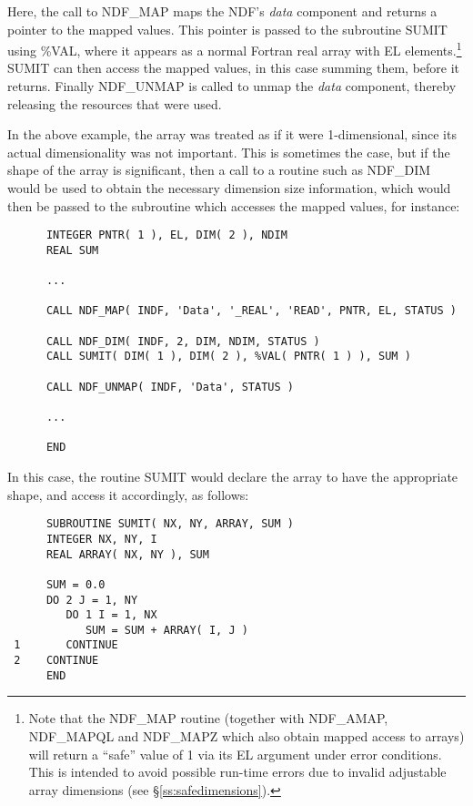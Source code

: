 \documentclass[twoside,11pt]{article}
\newcommand{\htmlref}[2]{#1}
\newcommand{\st}[1]{{\em{#1}}}
\begin{document}
Here, the call to NDF\_MAP maps the NDF's \st{data\/} component and returns a
pointer to the mapped values. 
This pointer is passed to the subroutine SUMIT using \%VAL, where it
appears as a normal Fortran real array with EL elements.\footnote{Note that
the NDF\_MAP routine (together with \htmlref{NDF\_AMAP}{NDF_AMAP}, \htmlref{NDF\_MAPQL}{NDF_MAPQL} and \htmlref{NDF\_MAPZ}{NDF_MAPZ}
which also obtain mapped access to arrays) will return a ``safe'' value of 1
via its EL argument under error conditions. 
This is intended to avoid possible run-time errors due to invalid
adjustable array dimensions (see \S\ref{ss:safedimensions}).}
SUMIT can then access the mapped values, in this case summing them, before 
it returns.
Finally NDF\_UNMAP is called to unmap the \st{data\/} component, thereby
releasing the resources that were used. 

In the above example, the array was treated as if it were 1-dimensional,
since its actual dimensionality was not important. 
This is sometimes the case, but if the shape of the array is significant,
then a call to a routine such as \htmlref{NDF\_DIM}{NDF_DIM} would be used to obtain the
necessary dimension size information, which would then be passed to the
subroutine which accesses the mapped values, for instance: 

\small
\begin{verbatim}
      INTEGER PNTR( 1 ), EL, DIM( 2 ), NDIM
      REAL SUM

      ...

      CALL NDF_MAP( INDF, 'Data', '_REAL', 'READ', PNTR, EL, STATUS )

      CALL NDF_DIM( INDF, 2, DIM, NDIM, STATUS )
      CALL SUMIT( DIM( 1 ), DIM( 2 ), %VAL( PNTR( 1 ) ), SUM )

      CALL NDF_UNMAP( INDF, 'Data', STATUS )

      ...

      END
\end{verbatim}
\normalsize

In this case, the routine SUMIT would declare the array to have the
appropriate shape, and access it accordingly, as follows: 

\small
\begin{verbatim}
      SUBROUTINE SUMIT( NX, NY, ARRAY, SUM )
      INTEGER NX, NY, I
      REAL ARRAY( NX, NY ), SUM

      SUM = 0.0
      DO 2 J = 1, NY
         DO 1 I = 1, NX
            SUM = SUM + ARRAY( I, J )
 1       CONTINUE
 2    CONTINUE
      END
\end{verbatim}
\normalsize
\end{document}

